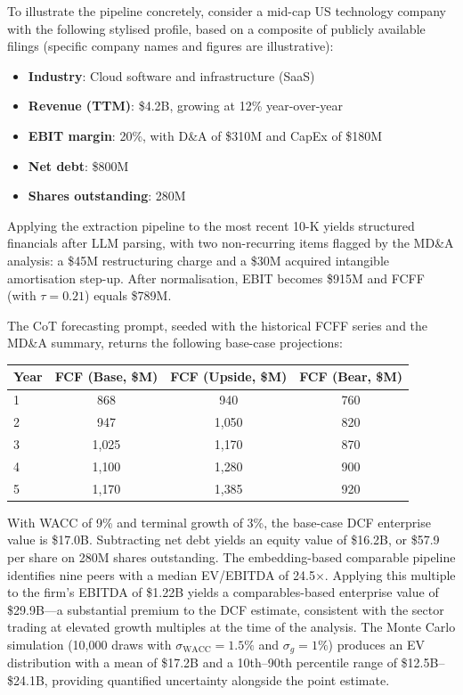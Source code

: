\begin{context}
To illustrate the pipeline concretely, consider a mid-cap US technology company
with the following stylised profile, based on a composite of publicly available
filings (specific company names and figures are illustrative):

\begin{itemize}
  \item \textbf{Industry}: Cloud software and infrastructure (SaaS)
  \item \textbf{Revenue (TTM)}: \$4.2B, growing at 12\% year-over-year
  \item \textbf{EBIT margin}: 20\%, with D\&A of \$310M and CapEx of \$180M
  \item \textbf{Net debt}: \$800M
  \item \textbf{Shares outstanding}: 280M
\end{itemize}

Applying the extraction pipeline to the most recent 10-K yields structured financials
after LLM parsing, with two non-recurring items flagged by the MD\&A analysis: a
\$45M restructuring charge and a \$30M acquired intangible amortisation step-up.
After normalisation, EBIT becomes \$915M and FCFF (with $\tau = 0.21$) equals
\$789M.

The CoT forecasting prompt, seeded with the historical FCFF series and the MD\&A
summary, returns the following base-case projections:

\begin{center}
\begin{tabular}{lccc}
\hline
Year & FCF (Base, \$M) & FCF (Upside, \$M) & FCF (Bear, \$M) \\
\hline
1 & 868 & 940 & 760 \\
2 & 947 & 1{,}050 & 820 \\
3 & 1{,}025 & 1{,}170 & 870 \\
4 & 1{,}100 & 1{,}280 & 900 \\
5 & 1{,}170 & 1{,}385 & 920 \\
\hline
\end{tabular}
\end{center}

With WACC of 9\% and terminal growth of 3\%, the base-case DCF enterprise value
is \$17.0B. Subtracting net debt yields an equity value of \$16.2B, or \$57.9 per
share on 280M shares outstanding. The embedding-based comparable pipeline identifies
nine peers with a median EV/EBITDA of 24.5$\times$. Applying this multiple to the
firm's EBITDA of \$1.22B yields a comparables-based enterprise value of \$29.9B---a
substantial premium to the DCF estimate, consistent with the sector trading at elevated
growth multiples at the time of the analysis. The Monte Carlo simulation (10{,}000
draws with $\sigma_\mathrm{WACC} = 1.5\%$ and $\sigma_g = 1\%$) produces an EV
distribution with a mean of \$17.2B and a 10th--90th percentile range of
\$12.5B--\$24.1B, providing quantified uncertainty alongside the point estimate.
\end{context}

